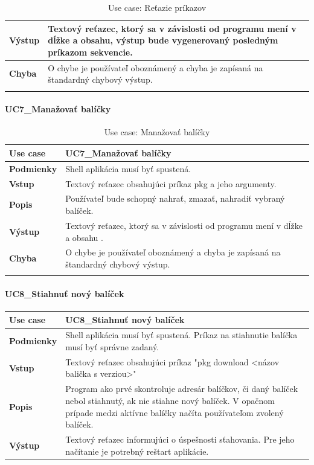 {\begin{center}
\begin{longtable}{|p{2.5cm}|p{12.2cm}|}
			\textbf{Výstup} & Textový reťazec, ktorý sa v závislosti od programu mení v dĺžke a obsahu, výstup bude vygenerovaný posledným príkazom sekvencie.\\
			\hline

			\textbf{Chyba} & O chybe je používateľ oboznámený a chyba je zapísaná na štandardný chybový výstup.\\
			\hline
	\caption{Use case: Reťazie príkazov}
	\label{table:1}

	\end{longtable}
\end{center}


\paragraph{UC7\_Manažovať balíčky}
\begin{center}
	\begin{longtable}{|p{2.5cm}|p{12.2cm}|}

			\hline
			\textbf{Use case} & UC7\_Manažovať balíčky \\ 
			\hline
			\textbf{Podmienky} & Shell aplikácia musí byť spustená.\\ 
			\hline
			\textbf{Vstup} & Textový reťazec obsahujúci príkaz pkg a jeho argumenty.\\
			\hline
			\textbf{Popis} & Používateľ bude schopný nahrať, zmazať, nahradiť vybraný balíček. \\ 
			\hline
			\textbf{Výstup} & Textový reťazec, ktorý sa v závislosti od programu mení v dĺžke a obsahu .\\
			\hline
			\textbf{Chyba} & O chybe je používateľ oboznámený a chyba je zapísaná na štandardný chybový výstup.\\
			\hline
	\caption{Use case: Manažovať balíčky}
	\label{table:1}

	\end{longtable}
\end{center}
\paragraph{UC8\_Stiahnuť nový balíček}
\begin{center}
	\begin{longtable}{|p{2.5cm}|p{12.2cm}|}
			\hline
			\textbf{Use case} & UC8\_Stiahnuť nový balíček \\ 
			\hline
			\textbf{Podmienky} & Shell aplikácia musí byť spustená. Príkaz na stiahnutie balíčka musí byť správne zadaný.\\ 
			\hline
			\textbf{Vstup} & Textový reťazec obsahujúci príkaz "pkg download <názov balička s verziou>"\\
			\hline
			\textbf{Popis} & Program ako prvé skontroluje adresár balíčkov, či daný balíček nebol stiahnutý, ak nie stiahne nový balíček. V opačnom prípade medzi aktívne balíčky načíta používateľom zvolený balíček.\\ 
			\hline
			\textbf{Výstup} & Textový reťazec  informujúci o úspešnosti sťahovania. Pre jeho načítanie je potrebný reštart aplikácie.\\
			\hline


\end{longtable}
\end{center}}
